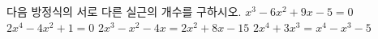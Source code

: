다음 방정식의 서로 다른 실근의 개수를 구하시오.
 $x^3-6x^2+9x-5=0$
 $2x^4-4x^2+1=0$
 $2x^3-x^2-4x=2x^2+8x-15$
 $2x^4+3x^3=x^4-x^3-5$
